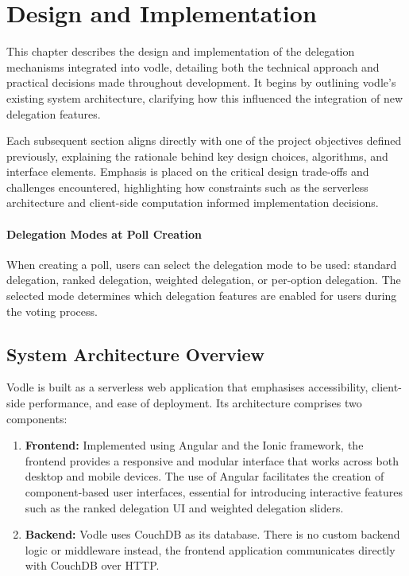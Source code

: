\chapter{Design and Implementation}
\label{ch:design_implementation}
This chapter describes the design and implementation of the delegation mechanisms integrated into vodle, detailing both the technical approach and practical decisions made throughout development. It begins by outlining vodle's existing system architecture, clarifying how this influenced the integration of new delegation features. 

Each subsequent section aligns directly with one of the project objectives defined previously, explaining the rationale behind key design choices, algorithms, and interface elements. Emphasis is placed on the critical design trade-offs and challenges encountered, highlighting how constraints such as the serverless architecture and client-side computation informed implementation decisions.

\subsubsection{Delegation Modes at Poll Creation}

When creating a poll, users can select the delegation mode to be used: standard delegation, ranked delegation, weighted delegation, or per-option delegation. The selected mode determines which delegation features are enabled for users during the voting process.

\section{System Architecture Overview}\label{sec:design_architecture}
Vodle is built as a serverless web application that emphasises accessibility, client-side performance, and ease of deployment. Its architecture comprises two components:

\begin{enumerate}
  \item \textbf{Frontend:} Implemented using Angular and the Ionic framework, the frontend provides a responsive and modular interface that works across both desktop and mobile devices. The use of Angular facilitates the creation of component-based user interfaces, essential for introducing interactive features such as the ranked delegation UI and weighted delegation sliders.
  \item \textbf{Backend:} Vodle uses CouchDB as its database. There is no custom backend logic or middleware
  instead, the frontend application communicates directly with CouchDB over HTTP.
\end{enumerate}

